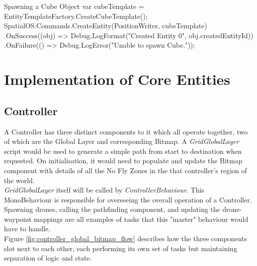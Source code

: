 \documentclass[a4paper,11pt,titlepage]{report}
\begin{document}
\begin{sexylisting}[colback=white]{Spawning a Cube Object}
var cubeTemplate = EntityTemplateFactory.CreateCubeTemplate();
SpatialOS.Commands.CreateEntity(PositionWriter, cubeTemplate)
  .OnSuccess((obj) =>
    Debug.LogFormat("Created Entity {0}", obj.createdEntityId))
  .OnFailure(() => Debug.LogError("Unable to spawn Cube."));
\end{sexylisting}

\newpage
\chapter{Implementation of Core Entities}
\section{Controller}
A Controller has three distinct components to it which all operate together, two of which are the Global Layer and corresponding Bitmap. A \textit{GridGlobalLayer} script would be used to generate a simple path from start to destination when requested. On initialisation, it would need to populate and update the Bitmap component with details of all the No Fly Zones in the that controller's region of the world.\\

\textit{GridGlobalLayer} itself will be called by \textit{ControllerBehaviour}. This MonoBehaviour is responsible for overseeing the overall operation of a Controller. Spawning drones, calling the pathfinding component, and updating the drone-waypoint mappings are all examples of tasks that this "master" behaviour would have to handle.\\

Figure \ref{fig:controller_global_bitmap_flow} describes how the three components slot next to each other, each performing its own set of tasks but maintaining separation of logic and state.
\end{document}
